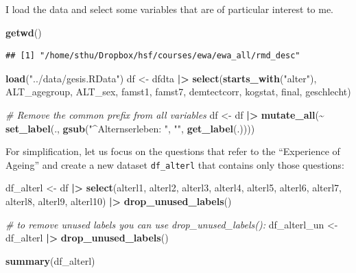 \documentclass[
  doc]{apa6}
\newenvironment{Shaded}{\begin{snugshade}}{\end{snugshade}}
\newcommand{\CommentTok}[1]{\textcolor[rgb]{0.56,0.35,0.01}{\textit{#1}}}
\newcommand{\FunctionTok}[1]{\textcolor[rgb]{0.13,0.29,0.53}{\textbf{#1}}}
\newcommand{\NormalTok}[1]{#1}
\newcommand{\OtherTok}[1]{\textcolor[rgb]{0.56,0.35,0.01}{#1}}
\newcommand{\SpecialCharTok}[1]{\textcolor[rgb]{0.81,0.36,0.00}{\textbf{#1}}}
\newcommand{\StringTok}[1]{\textcolor[rgb]{0.31,0.60,0.02}{#1}}
\begin{document}
I load the data and select some variables that are of particular interest to me.

\begin{Shaded}
\begin{Highlighting}[]
\FunctionTok{getwd}\NormalTok{()}
\end{Highlighting}
\end{Shaded}

\begin{verbatim}
## [1] "/home/sthu/Dropbox/hsf/courses/ewa/ewa_all/rmd_desc"
\end{verbatim}

\begin{Shaded}
\begin{Highlighting}[]
\FunctionTok{load}\NormalTok{(}\StringTok{"../data/gesis.RData"}\NormalTok{)}
\NormalTok{df }\OtherTok{\textless{}{-}}\NormalTok{ dfdta }\SpecialCharTok{|\textgreater{}}
  \FunctionTok{select}\NormalTok{(}\FunctionTok{starts\_with}\NormalTok{(}\StringTok{"alter"}\NormalTok{), }
\NormalTok{         ALT\_agegroup, }
\NormalTok{         ALT\_sex, }
\NormalTok{         famst1, famst7, }
\NormalTok{         demtectcorr, }
\NormalTok{         kogstat, }
\NormalTok{         final, }
\NormalTok{         geschlecht)}

\CommentTok{\# Remove the common prefix from all variables}
\NormalTok{df }\OtherTok{\textless{}{-}}\NormalTok{ df }\SpecialCharTok{|\textgreater{}} 
  \FunctionTok{mutate\_all}\NormalTok{(}\SpecialCharTok{\textasciitilde{}} \FunctionTok{set\_label}\NormalTok{(., }\FunctionTok{gsub}\NormalTok{(}\StringTok{"\^{}Alternserleben: "}\NormalTok{, }\StringTok{""}\NormalTok{, }\FunctionTok{get\_label}\NormalTok{(.))))}
\end{Highlighting}
\end{Shaded}

For simplification, let us focus on the questions that refer to the ``Experience of Ageing'' and create a new dataset \texttt{df\_alterl} that contains only those questions:

\begin{Shaded}
\begin{Highlighting}[]
\NormalTok{df\_alterl }\OtherTok{\textless{}{-}}\NormalTok{ df }\SpecialCharTok{|\textgreater{}} 
  \FunctionTok{select}\NormalTok{(alterl1, }
\NormalTok{         alterl2, }
\NormalTok{         alterl3, }
\NormalTok{         alterl4, }
\NormalTok{         alterl5, }
\NormalTok{         alterl6, }
\NormalTok{         alterl7, }
\NormalTok{         alterl8, }
\NormalTok{         alterl9, }
\NormalTok{         alterl10) }\SpecialCharTok{|\textgreater{}} 
  \FunctionTok{drop\_unused\_labels}\NormalTok{() }

\CommentTok{\# to remove unused labels you can use drop\_unused\_labels():}
\NormalTok{df\_alterl\_un }\OtherTok{\textless{}{-}}\NormalTok{ df\_alterl }\SpecialCharTok{|\textgreater{}}
  \FunctionTok{drop\_unused\_labels}\NormalTok{()}

\FunctionTok{summary}\NormalTok{(df\_alterl)}
\end{Highlighting}
\end{Shaded}
\end{document}
